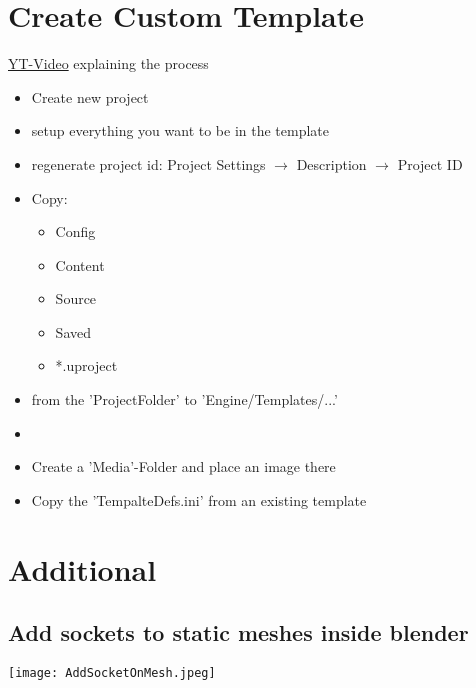 \documentclass{scrbook}
\begin{document}
    \chapter{Create Custom Template}
        \href{https://www.youtube.com/watch?time_continue=119&v=MYM7iSh-uac&feature=emb_logo}{YT-Video} explaining the process \\
        \begin{itemize}
            \item Create new project
            \item setup everything you want to be in the template
            \item regenerate project id: Project Settings $\rightarrow$ Description $\rightarrow$ Project ID
            \item Copy:
            \begin{itemize}
                \item Config
                \item Content
                \item Source
                \item Saved
                \item *.uproject
            \end{itemize}
            \item from the 'ProjectFolder' to 'Engine/Templates/...'
            \item 
            \item Create a 'Media'-Folder and place an image there
            \item Copy the 'TempalteDefs.ini' from an existing template
        \end{itemize}






\smallskip            
\smallskip
\newpage




    \chapter{Additional}
        \section{Add sockets to static meshes inside blender}
         \texttt{[image: AddSocketOnMesh.jpeg]}



\newpage
    \glsaddall
    \printglossary[title=Glossar, toctitle=Glossar]
    \printglossaries      
\end{document}
